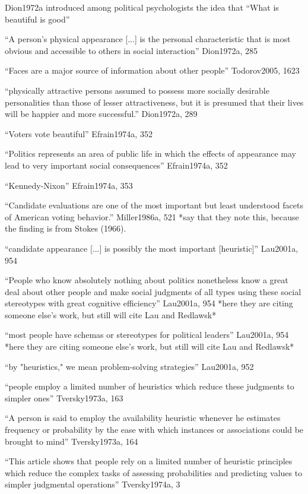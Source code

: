 Dion1972a introduced among political psychologists the idea that ``What is beautiful is good''

``A person's physical appearance [...] is the personal characteristic that is most obvious and accessible to others in social interaction'' Dion1972a, 285

``Faces are a major source of information about other people'' Todorov2005, 1623

``physically attractive persons assumed to possess more socially desirable personalities than those of lesser attractiveness, but it is presumed that their lives will be happier and more successful.'' Dion1972a, 289

``Voters vote beautiful'' Efrain1974a, 352

``Politics represents an area of public life in which the effects of appearance may lead to very important social consequences'' Efrain1974a, 352

``Kennedy-Nixon'' Efrain1974a, 353

``Candidate evaluations are one of the most important but least understood facets of American voting behavior.'' Miller1986a, 521 *say that they note this, because the finding is from Stokes (1966).


``candidate appearance [...] is possibly the most important [heuristic]'' Lau2001a, 954

``People who know absolutely nothing about politics nonetheless know a great deal about other people and make social judgments of all types using these social stereotypes with great cognitive efficiency'' Lau2001a, 954 *here they are citing someone else's work, but still will cite Lau and Redlawsk*

``most people have schemas or stereotypes for political leaders'' Lau2001a, 954 *here they are citing someone else's work, but still will cite Lau and Redlawsk*

``by "heuristics," we mean problem-solving strategies'' Lau2001a, 952

``people employ a limited number of heuristics which reduce these judgments to simpler ones'' Tversky1973a, 163

``A person is said to employ the availability heuristic whenever he estimates frequency or probability by the ease with which instances or associations could be brought to mind'' Tversky1973a, 164

``This article shows that people rely on a limited number of heuristic principles which reduce the complex tasks of assessing probabilities and predicting values to simpler judgmental operations'' Tversky1974a, 3

